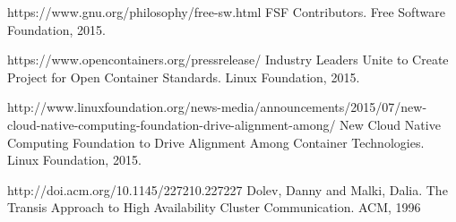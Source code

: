 \begin{thebibliography}{999}

https://www.gnu.org/philosophy/free-sw.html
FSF Contributors. Free Software Foundation, 2015.

%
%

https://www.opencontainers.org/pressrelease/
Industry Leaders Unite to Create Project for Open Container Standards. Linux Foundation, 2015.

%
%

http://www.linuxfoundation.org/news-media/announcements/2015/07/new-cloud-native-computing-foundation-drive-alignment-among/
New Cloud Native Computing Foundation to Drive Alignment Among Container Technologies. Linux Foundation, 2015.

%
%

%
%


%
%

http://doi.acm.org/10.1145/227210.227227
Dolev, Danny and Malki, Dalia. The Transis Approach to High Availability Cluster Communication. ACM, 1996

\end{thebibliography}